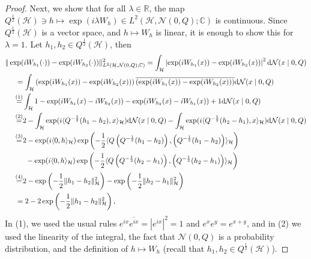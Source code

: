 \documentclass[letterpaper]{article} %
\newcommand{\R}{\mathbb{R}}
\newcommand{\hs}[1]{\mathcal{#1}} %
\newcommand{\Normal}{\mathcal{N}}
\newcommand{\C}{\mathbb{C}}
\newcommand{\stp}[2]{{\overset{(#2)}{#1}}}
\newcommand{\stpx}[1]{{(#1)}}
\begin{document}
\begin{proof}
Next, we show that for all $\lambda\in\R$, the map $Q^{\frac12}(\hs{H})\ni h \mapsto \exp(i \lambda W_h) \in L^2(\hs{H},\Normal(0,Q);\C)$ is continuous. 
Since $Q^{\frac12}(\hs{H})$ is a vector space, and $h \mapsto W_h$ is linear, it is enough to show this for $\lambda=1$.
Let $h_1,h_2\in Q^{\frac12}(\hs{H})$, then
\begin{align*}
    & \|\exp(iW_{h_1}(\cdot)) - \exp(iW_{h_2}(\cdot))\|_{L^2(\hs{H},\Normal(0,Q);\C)}^2
    = \int_\hs{H} \left|\exp(iW_{h_1}(x)) - \exp(iW_{h_2}(x))\right|^2\mathrm{d}\Normal(x\mid 0,Q) \\
    & \hspace{0.5cm} = \int_\hs{H} \left(\exp(iW_{h_1}(x)) - \exp(iW_{h_2}(x))\right)\overline{\left(\exp(iW_{h_1}(x)) - \exp(iW_{h_2}(x))\right)}\mathrm{d}\Normal(x\mid 0,Q) \\
    & \hspace{0.5cm} \stp{=}{1} \int_\hs{H} 1 - \exp(iW_{h_1}(x)-iW_{h_2}(x)) - \exp(iW_{h_2}(x)-iW_{h_1}(x)) + 1\mathrm{d}\Normal(x\mid 0,Q) \\
    & \hspace{0.5cm} \stp{=}{2} 2 - \int_\hs{H} \exp(i \langle Q^{-\frac12}(h_1-h_2),x\rangle_\hs{H})\mathrm{d}\Normal(x\mid 0,Q) - \int_\hs{H} \exp(i \langle Q^{-\frac12}(h_2-h_1),x\rangle_\hs{H})\mathrm{d}\Normal(x\mid 0,Q) \\
    & \hspace{0.5cm} \stp{=}{3} 2 
        -  \exp(i \langle 0, h\rangle_\hs{H}) \exp\left(-\frac{1}{2}\langle Q \left(Q^{-\frac12}(h_1-h_2)\right), \left(Q^{-\frac12}(h_1-h_2)\right) \rangle_\hs{H}\right) \\
        & \hspace{1cm} - \exp(i \langle 0, h\rangle_\hs{H}) \exp\left(-\frac{1}{2}\langle Q \left(Q^{-\frac12}(h_2-h_1)\right), \left(Q^{-\frac12}(h_2-h_1)\right) \rangle_\hs{H}\right) \\
    & \hspace{0.5cm} \stp{=}{4} 2 - \exp\left(-\frac12\|h_1-h_2\|_{\hs{H}}^2\right)
        - \exp\left(-\frac12\|h_2-h_1\|_{\hs{H}}^2\right) \\
    & \hspace{0.5cm} = 2 - 2\exp\left(-\frac12\|h_1-h_2\|_{\hs{H}}^2\right),
\end{align*}
In \stpx{1}, we used the usual rules $e^{ix}\overline{e^{ix}}=|e^{ix}|^2=1$
and $e^xe^y=e^{x+y}$,
and in \stpx{2} we used the linearity of the integral, the fact that $\Normal(0,Q)$ is a probability distribution, and the definition of $h \mapsto W_h$ (recall that $h_1,h_2\in Q^{\frac12}(\hs{H})$).

\end{proof}
\end{document}
